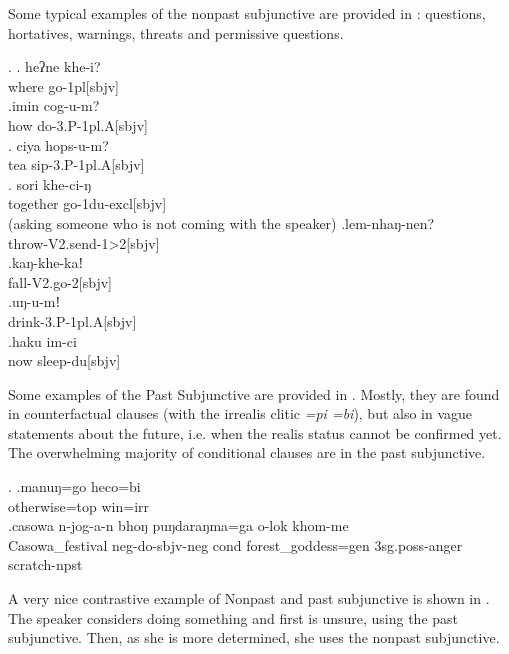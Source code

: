   Some typical examples of the nonpast subjunctive are provided in \Next: questions, hortatives, warnings,  threats and permissive questions.   

\ex. \ag. heʔne khe-i?\\
		where go{\sc -1pl[sbjv]}	\\
	 \bg.imin cog-u-m?\\
 how do{\sc -3.P-1pl.A[sbjv]}\\
	 \bg. ciya hops-u-m?\\
		tea sip{\sc -3.P-1pl.A[sbjv]}	\\
	 \bg. sori khe-ci-ŋ\\
	together go{\sc -1du-excl[sbjv]}\\
	 (asking someone who is not coming with the speaker)
	\bg.lem-nhaŋ-nen?\\
  throw{\sc -V2.send-1>2[sbjv]}\\
  \bg.kaŋ-khe-kaǃ\\
 fall{\sc -V2.go-2[sbjv]}\\
  \bg.uŋ-u-mǃ\\
  drink{\sc -3.P-1pl.A[sbjv]}\\
  \bg.haku im-ci\\
  now sleep{\sc -du[sbjv]}\\
  
  Some examples of the Past  Subjunctive are provided in \Next. Mostly, they are found in counterfactual clauses (with the irrealis clitic \emph{=pi \ti =bi}), but also in vague statements about the future, i.e. when the realis status cannot be confirmed yet. The overwhelming majority of conditional clauses are in the past subjunctive.
  
  \ex. \ag.manuŋ=go heco=bi\\
  otherwise{\sc =top} win{\sc [3sg;sbjv]=irr}\\
  \bg.casowa           n-jog-a-n     bhoŋ puŋdaraŋma=ga      o-lok     khom-me\\
  Casowa\_festival {\sc neg-}do{\sc [3sg]-sbjv-neg} {\sc cond} forest\_goddess{\sc =gen} {\sc 3sg.poss-}anger scratch{\sc [3sg]-npst}\\
   
  
A very nice contrastive  example of  Nonpast and  past subjunctive is shown in \Next. The speaker considers doing something and first is unsure, using the past subjunctive. Then, as she is more determined, she uses the nonpast subjunctive.

